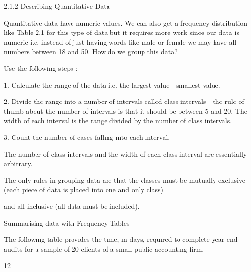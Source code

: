   

 

 2.1.2 Describing Quantitative Data

 

Quantitative data have numeric values. We can also get a frequency distribution like Table 2.1 for this type of data but it requires more work since our data is numeric i.e. instead of just having words like male or female we may have all numbers between 18 and 50. How do we group this data?

 

Use the following steps :

 

1.    Calculate the range of the data i.e. the largest value - smallest value.

 

2.    Divide the range into a number of intervals called class intervals - the rule of thumb about the number of intervals is that it should be between 5 and 20. The width of each interval is the range divided by the number of class intervals.

 

3.    Count the number of cases falling into each interval.



 

The number of class intervals and the width of each class interval are essentially arbitrary.

 

The only rules in grouping data are that the classes must be mutually exclusive (each piece of data is placed into one and only class)

and all-inclusive (all data must be included).

 

Summarising data with Frequency Tables

 

 The following table provides the time, in days, required to complete year-end audits for a sample of 20 clients of a small public accounting firm. 

 

 

















12
 

